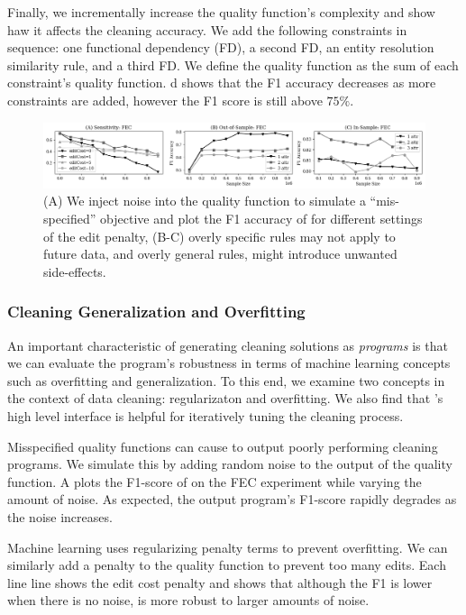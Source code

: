  Finally, we incrementally increase the quality function's complexity and show haw it affects the cleaning accuracy.  We add the following constraints in sequence: one functional dependency (FD), a second FD, an entity resolution similarity rule, and a third FD.  We define the quality function as the sum of each constraint's quality function.   d shows that the F1 accuracy decreases as more constraints are added, however the F1 score is still above $75\%$.  


 \begin{figure}[ht]
\centering
 \includegraphics[width=\textwidth]{exp/exp5.png}
 \caption{ (A) We inject noise into the quality function to simulate a ``mis-specified'' objective and plot the F1 accuracy of \sys for different settings of the edit penalty, (B-C) overly specific rules may not apply to future data, and overly general rules, might introduce unwanted side-effects. 
 \label{fig:sensitivity}}
\end{figure}

\subsubsection{Cleaning Generalization and Overfitting}
An important characteristic of generating cleaning solutions as {\it programs} is that we can evaluate the program's robustness in terms of machine learning concepts such as overfitting and generalization.    To this end, we examine two concepts in the context of data cleaning: regularizaton and overfitting.  We also find that \sys's high level interface is helpful for iteratively tuning the cleaning process.

  Misspecified quality functions can cause \sys to output poorly performing cleaning programs.  We simulate this by adding random noise to the output of the quality function. A plots the F1-score of \sys on the FEC experiment while varying the amount of noise.  As expected, the output program's F1-score rapidly degrades as the noise increases.  

Machine learning uses regularizing penalty terms to prevent overfitting.  We can similarly add a penalty to the quality function to prevent too many edits.  Each line line shows the edit cost penalty and shows that although the F1 is lower when there is no noise, \sys is more robust to larger amounts of noise. 

